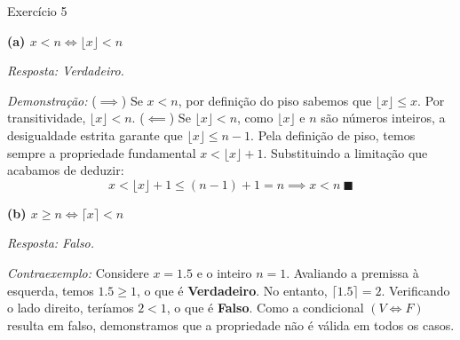 \documentclass[a4paper,11pt]{article}
\theoremstyle{definition}
\theoremstyle{plain}
\theoremstyle{remark}
\newcounter{questao}[section]
\begin{document}
\newpage \begin{questaoManually}{Exercício 5}

\textbf{(a) $x < n \iff \lfloor x \rfloor < n$}

\textit{Resposta: Verdadeiro.}

\textit{Demonstração:}
($\implies$) Se $x < n$, por definição do piso sabemos que $\lfloor x \rfloor \le x$. Por transitividade, $\lfloor x \rfloor < n$.
($\impliedby$) Se $\lfloor x \rfloor < n$, como $\lfloor x \rfloor$ e $n$ são números inteiros, a desigualdade estrita garante que $\lfloor x \rfloor \le n - 1$.
Pela definição de piso, temos sempre a propriedade fundamental $x < \lfloor x \rfloor + 1$. Substituindo a limitação que acabamos de deduzir:
\begin{equation}
x < \lfloor x \rfloor + 1 \le (n - 1) + 1 = n \implies x < n \ \blacksquare
\end{equation}


\textbf{(b) $x \ge n \iff \lceil x \rceil < n$}

\textit{Resposta: Falso.}

\textit{Contraexemplo:}
Considere $x = 1.5$ e o inteiro $n = 1$.
Avaliando a premissa à esquerda, temos $1.5 \ge 1$, o que é \textbf{Verdadeiro}.
No entanto, $\lceil 1.5 \rceil = 2$. Verificando o lado direito, teríamos $2 < 1$, o que é \textbf{Falso}.
Como a condicional $(V \iff F)$ resulta em falso, demonstramos que a propriedade não é válida em todos os casos. \blacksquare


\end{questaoManually}
\end{document}
